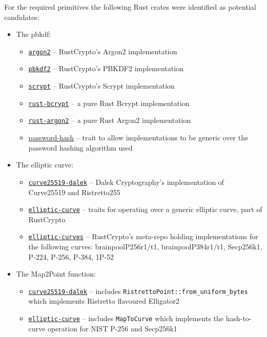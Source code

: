 For the required primitives the following Rust crates were identified as potential candidates:
\begin{itemize}
  \item{
    The \gls{pbkdf}:
    \begin{itemize}
      \item{\href{https://github.com/RustCrypto/password-hashes/tree/master/argon2}{\texttt{argon2}} -- RustCrypto's Argon2 implementation}
      \item{\href{https://github.com/RustCrypto/password-hashes/tree/master/pbkdf2}{\texttt{pbkdf2}} -- RustCrypto's PBKDF2 implementation}
      \item{\href{https://github.com/RustCrypto/password-hashes/tree/master/scrypt}{\texttt{scrypt}} -- RustCrypto's Scrypt implementation}
      \item{\href{https://github.com/Keats/rust-bcrypt}{\texttt{rust-bcrypt}} -- a pure Rust Bcrypt implementation}
      \item{\href{https://github.com/sru-systems/rust-argon2}{\texttt{rust-argon2}} -- a pure Rust Argon2 implementation}
      \item{\href{https://github.com/RustCrypto/traits/tree/master/password-hash}{password-hash} -- trait to allow implementations to be generic over the password hashing algorithm used}
    \end{itemize}
  }

  \item{
    The elliptic curve:
    \begin{itemize}
      \item{\href{https://github.com/dalek-cryptography/curve25519-dalek}{\texttt{curve25519-dalek}} -- Dalek Cryptography's implementation of Curve25519 and Ristretto255 \cite{ristretto255}}
      \item{\href{https://github.com/RustCrypto/traits/tree/master/elliptic-curve}{\texttt{elliptic-curve}} -- traits for operating over a generic elliptic curve, part of RustCrypto}
      \item{\href{https://github.com/RustCrypto/elliptic-curves}{\texttt{elliptic-curves}} -- RustCrypto's meta-repo holding implementations for the following curves: brainpoolP256r1/t1, brainpoolP384r1/t1, Secp256k1, P-224, P-256, P-384, 1P-52}
    \end{itemize}
  }

  \item{
    The \textsf{Map2Point} function:
    \begin{itemize}
      \item{\href{https://github.com/dalek-cryptography/curve25519-dalek}{\texttt{curve25519-dalek}} -- includes \verb|RistrettoPoint::from_uniform_bytes| which implements Ristretto flavoured Elligator2}
      \item{\href{https://github.com/RustCrypto/traits/tree/master/elliptic-curve}{\texttt{elliptic-curve}} -- includes \texttt{MapToCurve} which implements the hash-to-curve operation for NIST P-256 and Secp256k1}
    \end{itemize}
  }


\end{itemize}
